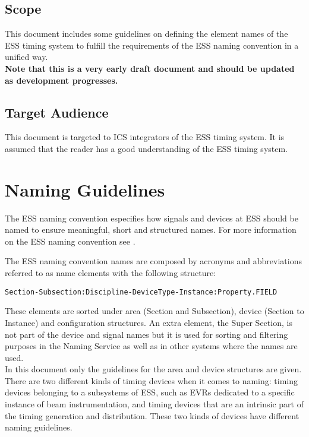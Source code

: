 \documentclass[11pt
  , a4paper
  , article
  , oneside
  , showtrims
]{memoir}
\begin{document}
\section{Scope}
This document includes some guidelines on defining the element names of the ESS timing system to fulfill the requirements of the ESS naming convention in a unified way.\\

\textbf{Note that this is a very early draft document and should be updated as development progresses.}

\section{Target Audience}
This document is targeted to ICS integrators of the ESS timing system. It is assumed that the reader has a good understanding of the ESS timing system.


\clearpage

\chapter{Naming Guidelines}
The ESS naming convention especifies how signals and devices at ESS should be named to ensure meaningful, short and structured names. For more information on the ESS naming convention see \cite{bib:naming}.

The ESS naming convention names are composed by acronyms and abbreviations referred to as name elements with the following structure:
\begin{lstlisting}[style=termstyle]
Section-Subsection:Discipline-DeviceType-Instance:Property.FIELD
\end{lstlisting}
These elements are sorted under area (Section and Subsection), device (Section to Instance) and configuration structures. An extra element, the Super Section, is not part of the device and signal names but it is used for sorting and filtering purposes in the Naming Service as well as in other systems where the names are used.\\

In this document only the guidelines for the area and device structures are given.\\

There are two different kinds of timing devices when it comes to naming: timing devices belonging to a subsystems of ESS, such as EVRs dedicated to a specific instance of beam instrumentation, and timing devices that are an intrinsic part of the timing generation and distribution. These two kinds of devices have different naming guidelines.
\end{document}
